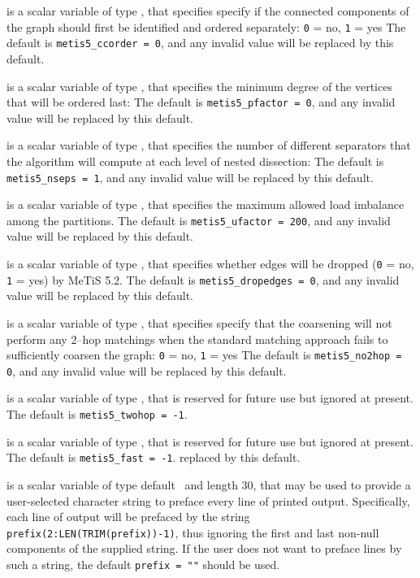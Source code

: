 \documentclass{galahad}
\begin{document}
\begin{description}
 is a scalar variable of type \integer, that specifies
specify if the connected components of the graph should first be
identified and ordered separately: {\tt 0} = no, {\tt 1} = yes
The default is {\tt metis5\_ccorder = 0}, and any invalid value will be
replaced by this default.

 is a scalar variable of type \integer, that specifies
the minimum degree of the vertices that will be ordered last:
The default is {\tt metis5\_pfactor = 0}, and any invalid value will be
replaced by this default.

 is a scalar variable of type \integer, that specifies
the number of different separators that the algorithm will compute
at each level of nested dissection:
The default is {\tt metis5\_nseps = 1}, and any invalid value will be
replaced by this default.

 is a scalar variable of type \integer, that specifies
the maximum allowed load imbalance among the partitions.
The default is {\tt metis5\_ufactor = 200}, and any invalid value will be
replaced by this default.

 is a scalar variable of type \integer, that specifies
whether edges will be dropped ({\tt 0} = no, {\tt 1} = yes) by MeTiS 5.2.
The default is {\tt metis5\_dropedges = 0}, and any invalid value will be
replaced by this default.

 is a scalar variable of type \integer, that specifies
specify that the coarsening will not perform any 2–hop matchings when 
the standard matching approach fails to sufficiently coarsen the graph:
{\tt 0} = no, {\tt 1} = yes
The default is {\tt metis5\_no2hop = 0}, and any invalid value will be
replaced by this default.

 is a scalar variable of type \integer, 
that is reserved for future use but ignored at present.
The default is {\tt metis5\_twohop = -1}.

 is a scalar variable of type \integer, 
that is reserved for future use but ignored at present.
The default is {\tt metis5\_fast = -1}.
replaced by this default.

 is a scalar variable of type default \character\
and length 30, that may be used to provide a user-selected
character string to preface every line of printed output.
Specifically, each line of output will be prefaced by the string
{\tt prefix(2:LEN(TRIM(prefix))-1)},
thus ignoring the first and last non-null components of the
supplied string. If the user does not want to preface lines by such
a string, the default {\tt prefix = ""} should be used.


\end{description}
\end{document}
